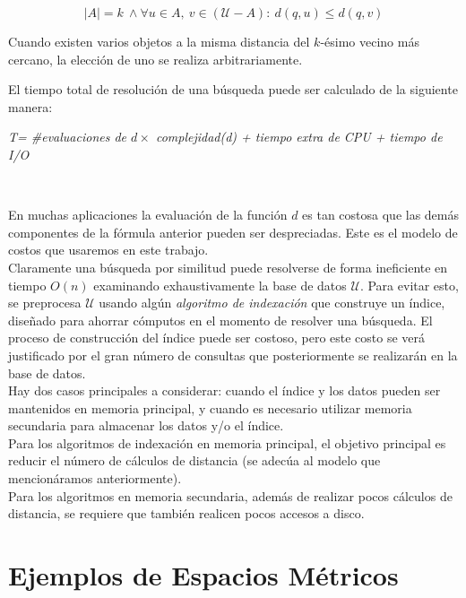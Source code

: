 \begin{description}
          \vspace{-3mm}
         \[|A| =k \ \wedge \forall u \in A,\  v \in ( \mathcal{U} - A) :
          \ d(q,u) \leq d(q,v)\]
          
          Cuando existen varios objetos a la misma distancia del $k$-\'esimo 
          vecino m\'as cercano, la elecci\'on de uno se realiza arbitrariamente.
           
\end{description}

El tiempo total de resoluci\'on de una b\'usqueda puede ser calculado de la
siguiente manera:\\

\centerline{
    \em T= \#evaluaciones  de $d \times $ complejidad(d) +  tiempo extra de CPU + tiempo de  I/O
}
 \
 \
 
En muchas aplicaciones  la evaluaci\'on de la funci\'on $d$ es tan costosa que las dem\'as componentes de la f\'ormula anterior pueden ser despreciadas. Este es el modelo de costos  que usaremos en este trabajo.\\

Claramente una b\'usqueda por similitud puede resolverse de forma ineficiente en tiempo  $O(n)$ examinando exhaustivamente la base de datos $\mathcal{U}$. Para evitar esto, se preprocesa $\mathcal{U}$ usando alg\'un {\em algoritmo de indexaci\'on} que construye  un \'indice, dise\~nado  para ahorrar c\'omputos en el momento de resolver una b\'usqueda. El proceso de  construcci\'on del \'indice puede ser costoso, pero este costo se ver\'a justificado por el gran n\'umero de consultas que posteriormente se realizar\'an en la base de datos.\\

Hay dos casos principales a considerar: cuando el \'indice y los datos pueden ser mantenidos en memoria principal, y cuando es necesario utilizar memoria secundaria para almacenar los datos y/o el \'indice.\\

Para los algoritmos de indexaci\'on en memoria principal, el objetivo principal es reducir el n\'umero de c\'alculos de distancia (se adec\'ua al modelo que mencion\'aramos anteriormente).\\

Para los algoritmos en memoria secundaria, adem\'as de realizar pocos c\'alculos de distancia, se requiere que tambi\'en realicen pocos accesos a disco. 


\section{Ejemplos de Espacios M\'etricos}

